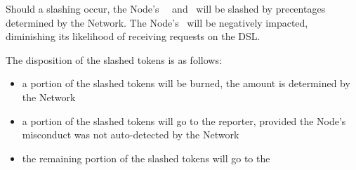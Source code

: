 Should a slashing occur, the Node's \deposit\, \stakingPool\, and \networkReward\ will be slashed by precentages determined by the Network.
The Node's \reliabilityScore\ will be negatively impacted, diminishing its likelihood of receiving requests on the \gls{DSL}.

The disposition of the slashed tokens is as follows:
\begin{itemize}
    \item a portion of the slashed tokens will be burned, the amount is determined by the Network
    \item a portion of the slashed tokens will go to the reporter, provided the Node’s misconduct was not auto-detected by the Network
    \item the remaining portion of the slashed tokens will go to the \publicGoodPool
\end{itemize}

